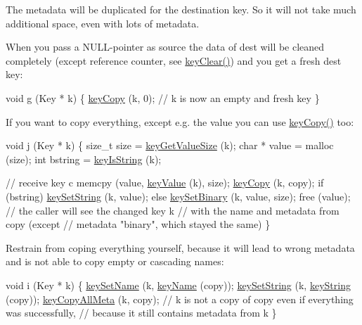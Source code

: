 The metadata will be duplicated for the destination key. So it will not take much additional space, even with lots of metadata.

When you pass a N\+U\+L\+L-\/pointer as source the data of dest will be cleaned completely (except reference counter, see \hyperlink{group__key_gab2242311a36bbc0520e0d36895107ec1}{key\+Clear()}) and you get a fresh dest key\+:


\begin{DoxyCodeInclude}
\textcolor{keywordtype}{void} g (Key * k)
\{
        \hyperlink{group__key_ga6a12cbbe656a1ad9f41b8c681d7a2f92}{keyCopy} (k, 0);
        \textcolor{comment}{// k is now an empty and fresh key}
\}
\end{DoxyCodeInclude}
 If you want to copy everything, except e.\+g. the value you can use \hyperlink{group__key_ga6a12cbbe656a1ad9f41b8c681d7a2f92}{key\+Copy()} too\+:


\begin{DoxyCodeInclude}
\textcolor{keywordtype}{void} j (Key * k)
\{
        \textcolor{keywordtype}{size\_t} size = \hyperlink{group__keyvalue_gae326672fffb7474abfe9baf53b73217e}{keyGetValueSize} (k);
        \textcolor{keywordtype}{char} * value = malloc (size);
        \textcolor{keywordtype}{int} bstring = \hyperlink{group__keytest_gaea7670778abd07fee0fe8ac12a149190}{keyIsString} (k);

        \textcolor{comment}{// receive key c}
        memcpy (value, \hyperlink{group__keyvalue_ga6f29609c5da53c6dc26a98678d5752af}{keyValue} (k), size);
        \hyperlink{group__key_ga6a12cbbe656a1ad9f41b8c681d7a2f92}{keyCopy} (k, copy);
        \textcolor{keywordflow}{if} (bstring)
                \hyperlink{group__keyvalue_ga622bde1eb0e0c4994728331326340ef2}{keySetString} (k, value);
        \textcolor{keywordflow}{else}
                \hyperlink{group__keyvalue_gaa50a5358fd328d373a45f395fa1b99e7}{keySetBinary} (k, value, size);
        free (value);
        \textcolor{comment}{// the caller will see the changed key k}
        \textcolor{comment}{// with the name and metadata from copy (except}
        \textcolor{comment}{// metadata "binary", which stayed the same)}
\}
\end{DoxyCodeInclude}
 Restrain from coping everything yourself, because it will lead to wrong metadata and is not able to copy empty or cascading names\+:


\begin{DoxyCodeInclude}
\textcolor{keywordtype}{void} i (Key * k)
\{
        \hyperlink{group__keyname_ga7699091610e7f3f43d2949514a4b35d9}{keySetName} (k, \hyperlink{group__keyname_ga8e805c726a60da921d3736cda7813513}{keyName} (copy));
        \hyperlink{group__keyvalue_ga622bde1eb0e0c4994728331326340ef2}{keySetString} (k, \hyperlink{group__keyvalue_ga880936f2481d28e6e2acbe7486a21d05}{keyString} (copy));
        \hyperlink{group__keymeta_ga8e63720a65610a29597494d0671f9401}{keyCopyAllMeta} (k, copy);
        \textcolor{comment}{// k is not a copy of copy even if everything was successfully,}
        \textcolor{comment}{// because it still contains metadata from k}
\}
\end{DoxyCodeInclude}



